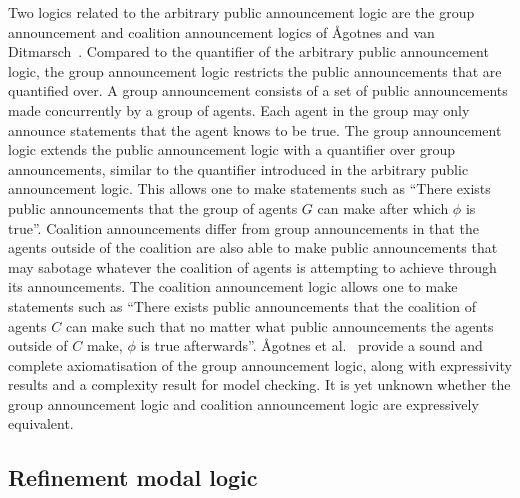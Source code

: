 Two logics related to the arbitrary public announcement logic are the group
announcement and coalition announcement logics of {\AA}gotnes and van
Ditmarsch~\cite{agotnes:2008,agotnes:2010}.  Compared to the quantifier of the
arbitrary public announcement logic, the group announcement logic restricts the
public announcements that are quantified over.  A group announcement consists of
a set of public announcements made concurrently by a group of agents. Each agent
in the group may only announce statements that the agent knows to be true. The
group announcement logic extends the public announcement logic with a quantifier
over group announcements, similar to the quantifier introduced in the arbitrary
public announcement logic.  This allows one to make statements such as ``There
exists public announcements that the group of agents $G$ can make after which
$\phi$ is true''. Coalition announcements differ from group announcements in
that the agents outside of the coalition are also able to make public
announcements that may sabotage whatever the coalition of agents is attempting
to achieve through its announcements. The coalition announcement logic allows
one to make statements such as ``There exists public announcements that the
coalition of agents $C$ can make such that no matter what public announcements
the agents outside of $C$ make, $\phi$ is true afterwards''.  {\AA}gotnes et
al.~\cite{agotnes:2010} provide a sound and complete axiomatisation of the group
announcement logic, along with expressivity results and a complexity result for
model checking. It is yet unknown whether the group announcement logic and
coalition announcement logic are expressively equivalent.


\subsection{Refinement modal logic}

